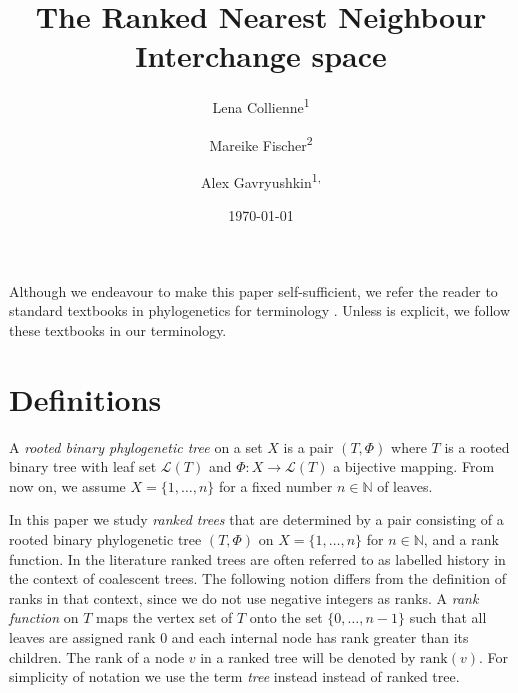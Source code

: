 \documentclass{amsart}
\title{The Ranked Nearest Neighbour Interchange space}
\date{\today}
\author{Lena Collienne\textsuperscript{1}}
\author{Mareike Fischer\textsuperscript{2}}
\author{Alex Gavryushkin\textsuperscript{1, \Letter}}
\newcommand{\rank}{\mathrm{rank}}
\begin{document}
\maketitle

\begin{abstract}

\end{abstract}






Although we endeavour to make this paper self-sufficient, we refer the reader to standard textbooks in phylogenetics for terminology \autocite{Felsenstein2004-of, Semple2003-nj, Steel2016-ye}.
Unless is explicit, we follow these textbooks in our terminology.


\section{Definitions}

A \emph{rooted binary phylogenetic tree} on a set $X$ is a pair $(T, \Phi)$ where $T$ is a rooted binary tree with leaf set $\mathcal{L}(T)$ and $\Phi:X \to \mathcal{L}(T)$ a bijective mapping.
From now on, we assume $X = \{1,\ldots,n\}$ for a fixed number $n \in \mathbb N$ of leaves.

In this paper we study \emph{ranked trees} that are determined by a pair consisting of a rooted binary phylogenetic tree $(T, \Phi)$ on $X = \{1, \ldots, n\}$ for $n \in \mathbb N$, and a rank function.
In the literature ranked trees are often referred to as labelled history in the context of coalescent trees.
The following notion differs from the definition of ranks in that context, since we do not use negative integers as ranks.
A \emph{rank function} on $T$ maps the vertex set of $T$ onto the set $\{0,\ldots,n-1\}$ such that all leaves are assigned rank $0$ and each internal node has rank greater than its children.
The rank of a node $v$ in a ranked tree will be denoted by $\rank(v)$.
For simplicity of notation we use the term \emph{tree} instead instead of ranked tree.
\end{document}
